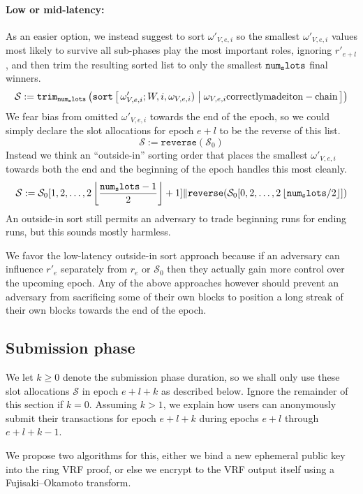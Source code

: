 \paragraph{Low or mid-latency:} 
As an easier option, we instead suggest to sort $\omega'_{V,e,i}$ so the smallest $\omega'_{V,e,i}$ values most likely to survive all sub-phases play the most important roles, ignoring $r'_{e+l}$, and then trim the resulting sorted list to only the smallest $\mathtt{num_slots}$ final winners. 
$$ 
\mathcal{S} := \mathtt{trim}_\vrfaslotsbound \left( 
\mathtt{sort} \Listst{
  \omega'_{V,e,i}; W,i,\omega_{V,e,i}) 
}{
  \omega_{V,e,i} \mathrm{ correctly made it on-chain}
} \right) 
$$
We fear bias from omitted $\omega'_{V,e,i}$ towards the end of the epoch, so we could simply declare the slot allocations for epoch $e+l$ to be the reverse of this list.
$$ \mathcal{S} := \mathtt{reverse}( \mathcal{S}_0 )$$
Instead we think an ``outside-in'' sorting order that places the smallest $\omega'_{V,e,i}$ towards both the end and the beginning of the epoch handles this most cleanly.
$$ 
\mathcal{S} := 
  \mathcal{S}_0[ 1,2,\ldots, 2 \left\lfloor {\mathtt{num_slots}-1 \over 2} \right\rfloor + 1 ]
\|
  \mathtt{reverse}( \mathcal{S}_0[ 0,2,\ldots, 2 \left\lfloor \mathtt{num_slots}/2 \right\rfloor] )
$$
An outside-in sort still permits an adversary to trade beginning runs for ending runs, but this sounds mostly harmless.

We favor the low-latency outside-in sort approach because if an adversary can influence $r'_e$ separately from $r_e$ or $\mathcal{S}_0$ then they actually gain more control over the upcoming epoch.  Any of the above approaches however should prevent an adversary from sacrificing some of their own blocks to position a long streak of their own blocks towards the end of the epoch.  


\subsection{Submission phase}\label{subsec:submission_phase}

We let $k \ge 0$ denote the submission phase duration, so we shall only use these slot allocations $\mathcal{S}$ in epoch $e+l+k$ as described below.  Ignore the remainder of this section if $k=0$.  Assuming $k>1$, we explain how users can anonymously submit their transactions for epoch $e+l+k$ during epochs $e+l$ through $e+l+k-1$.

We propose two algorithms for this, either we bind a new ephemeral public key into the ring VRF proof, or else we encrypt to the VRF output itself using a Fujisaki–Okamoto transform. 

